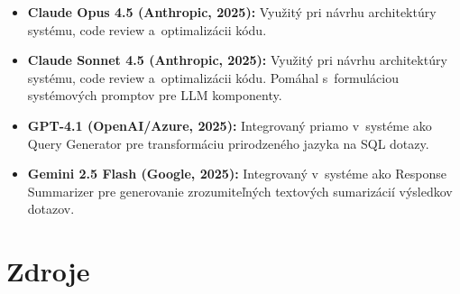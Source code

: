 \documentclass[a4paper, 12pt]{article}
\begin{document}
\begin{itemize}
    \item \textbf{Claude Opus 4.5 (Anthropic, 2025):} Využitý pri návrhu architektúry systému, code review a~optimalizácii kódu.
\end{itemize}
\begin{itemize}
    \item \textbf{Claude Sonnet 4.5 (Anthropic, 2025):} Využitý pri návrhu architektúry systému, code review a~optimalizácii kódu. Pomáhal s~formuláciou systémových promptov pre LLM komponenty.
\end{itemize}
\begin{itemize}
    \item \textbf{GPT-4.1 (OpenAI/Azure, 2025):} Integrovaný priamo v~systéme ako Query Generator pre transformáciu prirodzeného jazyka na SQL dotazy.
\end{itemize}

\begin{itemize}
    \item \textbf{Gemini 2.5 Flash (Google, 2025):} Integrovaný v~systéme ako Response Summarizer pre generovanie zrozumiteľných textových sumarizácií výsledkov dotazov.
\end{itemize}


\clearpage

\section*{Zdroje}
\end{document}

